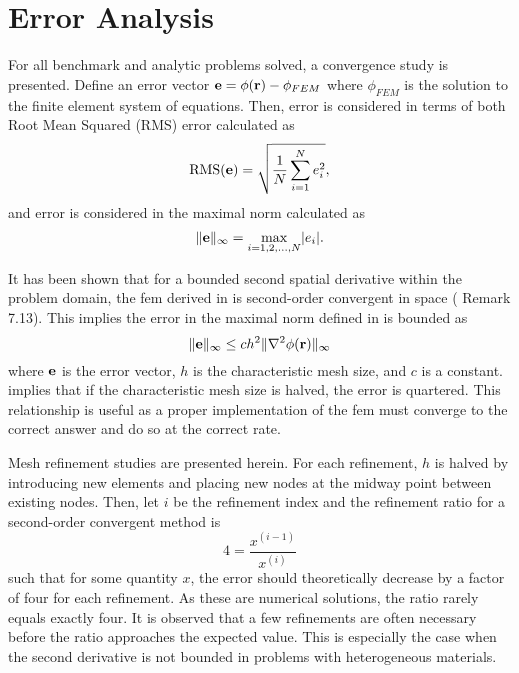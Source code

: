 \section{Error Analysis}
  For all benchmark and analytic problems solved, a convergence study is 
  presented. Define an error vector $\mathbf{e} = \phi(\mathbf{r}) - \phi_{FEM}$ where
  $\phi_{FEM}$ is the solution to the finite element system of equations. Then, 
  error is considered in terms of both Root Mean Squared (RMS) error calculated 
  as 
  \begin{equation} 
    \label{eq:rms}
    \text{RMS}(\mathbf{e}) = \sqrt{\frac{1}{N} \sum_{i=1}^{N} e_i^2},
  \end{equation}
  and error is considered in the maximal norm calculated as
  \begin{equation} 
    \label{eq:infnorm}
    \|\mathbf{e}\|_{\infty} = \max_{i=1,2,\ldots,N} \lvert e_i \rvert.
  \end{equation}

  It has been shown that for a bounded second spatial derivative 
  within the problem domain, the \gls{fem} derived in  
  is second-order convergent in space (\cite{textbookli} Remark 7.13).
  This implies the error in the maximal norm defined in  is
  bounded as
  \begin{equation} 
    \label{eq:error_bound}
    \|\mathbf{e}\|_{\infty} \le c h^2 \| \mathbf{\nabla}^2 \phi(\mathbf{r}) \|_{\infty}
  \end{equation}
  where $\mathbf{e}$ is the error vector, $h$ is the characteristic mesh size, and $c$
  is a constant.  implies that if the characteristic mesh 
  size is halved, the error is quartered. This relationship is useful as a 
  proper implementation of the \gls{fem} must converge to the correct answer and 
  do so at the correct rate.
  
  Mesh refinement studies are presented herein. For each refinement, $h$ is 
  halved by introducing new elements and placing new nodes at the midway point
  between existing nodes. Then, let $i$ be the refinement index and the
  refinement ratio for a second-order convergent method is 
  \begin{equation}
    4 = \frac{x^{(i-1)}}{x^{(i)}}
  \end{equation}
  such that for some quantity $x$, the error should theoretically decrease by a
  factor of four for each refinement. As these are numerical solutions, the 
  ratio rarely equals exactly four. It is observed that a few refinements are 
  often necessary before the ratio approaches the expected value. This is 
  especially the case when the second derivative is not bounded in problems with 
  heterogeneous materials.
  
